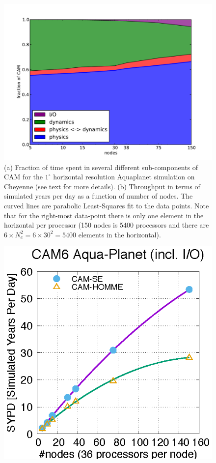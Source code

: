\documentclass{agujournal}
\begin{document}
{\begin{figure}[h]
\centering
 \includegraphics[scale=0.5]{figs/percent}
 \caption{(a) Fraction of time spent in several different sub-components of CAM for the $1^\circ$ horizontal resolution Aquaplanet simulation on Cheyenne (see text for more details). (b) Throughput in terms of simulated years per day as a function of number of nodes. The curved lines are parabolic Least-Squares fit to the data points. Note that for the right-most data-point there is only one element in the horizontal per processor (150 nodes is 5400 processors and there are $6\times N_e^2=6\times 30^2=5400$ elements in the horizontal).}
 \label{fig:percent}
\end{figure}
\begin{figure}[h]
\centering
 \includegraphics[scale=1.0]{figs/SYPD}

\end{figure}}
\end{document}
